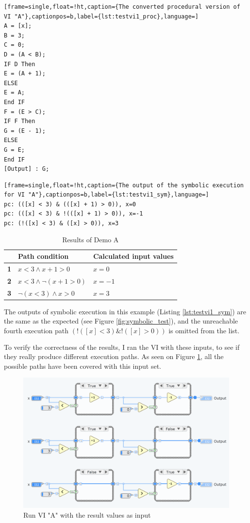 \begin{lstlisting}[frame=single,float=!ht,caption={The converted procedural version of VI "A"},captionpos=b,label={lst:testvi1_proc},language=]
A = [x]; 
B = 3; 
C = 0; 
D = (A < B); 
IF D Then
E = (A + 1); 
ELSE
E = A; 
End IF
F = (E > C); 
IF F Then
G = (E - 1); 
ELSE
G = E; 
End IF
[Output] : G; 
\end{lstlisting}

\begin{lstlisting}[frame=single,float=!ht,caption={The output of the symbolic execution for VI "A"},captionpos=b,label={lst:testvi1_sym},language=]
pc: (([x] < 3) & (([x] + 1) > 0)), x=0
pc: (([x] < 3) & !(([x] + 1) > 0)), x=-1
pc: (!([x] < 3) & ([x] > 0)), x=3
\end{lstlisting}

\begin{table}[]
\centering

\def\arraystretch{1.5}
\begin{tabular}{|l|l|l|}
\hline
           & \textbf{Path condition}                                         & \textbf{Calculated input values} \\ \hline
\textbf{1} & $x< 3\wedge x+1> 0$ & $x=0$                              \\ \hline
\textbf{2} & $x< 3\wedge \neg (x+1> 0)$ & $x=-1 $                            \\ \hline
\textbf{3} & $\neg(x< 3)\wedge x>0$ & $x=3$                     \\ \hline
\end{tabular}
\caption{Results of Demo A}
  \label{Tab:testvi1resu}
\end{table}
The outputs of symbolic execution in this example (Listing \ref{lst:testvi1_sym}) are the same as the expected (see Figure \ref{fig:symbolic_test}), and the unreachable fourth execution path $(!([x] < 3) \& !([x] > 0))$ is omitted from the list.

To verify the correctness of the results, I ran the VI with these inputs, to see if they really produce different execution paths. As seen on Figure \ref{fig:verify1}, all the possible paths have been covered with this input set.
\begin{figure}
\centering
\includegraphics[width=140mm,keepaspectratio]{figures/verify1.png}
\caption{Run VI "A" with the result values as input} 
\label{fig:verify1}
\end{figure}

